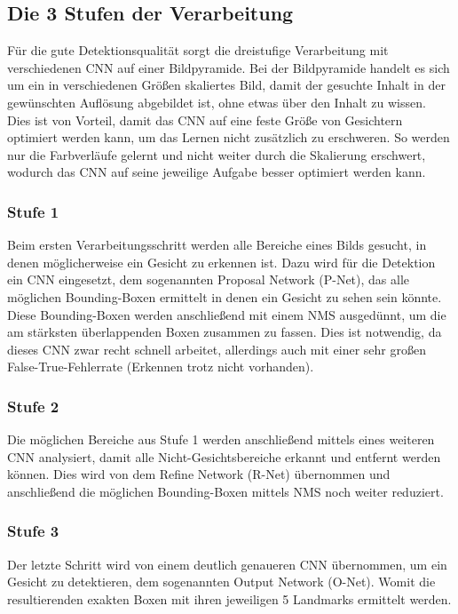 \subsection{Die 3 Stufen der Verarbeitung}
Für die gute Detektionsqualität sorgt die dreistufige Verarbeitung mit verschiedenen CNN auf einer Bildpyramide. Bei der Bildpyramide handelt es sich um ein in verschiedenen Größen skaliertes Bild, damit der gesuchte Inhalt in der gewünschten Auflösung abgebildet ist, ohne etwas über den Inhalt zu wissen.\\
Dies ist von Vorteil, damit das CNN auf eine feste Größe von Gesichtern optimiert werden kann, um das Lernen nicht zusätzlich zu erschweren. So werden nur die Farbverläufe gelernt und nicht weiter durch die Skalierung erschwert, wodurch das CNN auf seine jeweilige Aufgabe besser optimiert werden kann.
\newpage
\subsubsection{Stufe 1}
Beim ersten Verarbeitungsschritt werden alle Bereiche eines Bilds gesucht, in denen möglicherweise ein Gesicht zu erkennen ist. Dazu wird für die Detektion ein CNN eingesetzt, dem sogenannten Proposal Network (P-Net), das alle möglichen Bounding-Boxen ermittelt in denen ein Gesicht zu sehen sein könnte. Diese Bounding-Boxen werden anschließend mit einem NMS ausgedünnt, um die am stärksten überlappenden Boxen zusammen zu fassen. Dies ist notwendig, da dieses CNN zwar recht schnell arbeitet, allerdings auch mit einer sehr großen False-True-Fehlerrate (Erkennen trotz nicht vorhanden).
\subsubsection{Stufe 2}
Die möglichen Bereiche aus Stufe 1 werden anschließend mittels eines weiteren CNN analysiert, damit alle Nicht-Gesichtsbereiche erkannt und entfernt werden können. Dies wird von dem Refine Network (R-Net) übernommen und anschließend die möglichen Bounding-Boxen mittels NMS noch weiter reduziert.
\subsubsection{Stufe 3}
Der letzte Schritt wird von einem deutlich genaueren CNN übernommen, um ein Gesicht zu detektieren, dem sogenannten Output Network (O-Net). Womit die resultierenden exakten Boxen mit ihren jeweiligen 5 Landmarks ermittelt werden.
